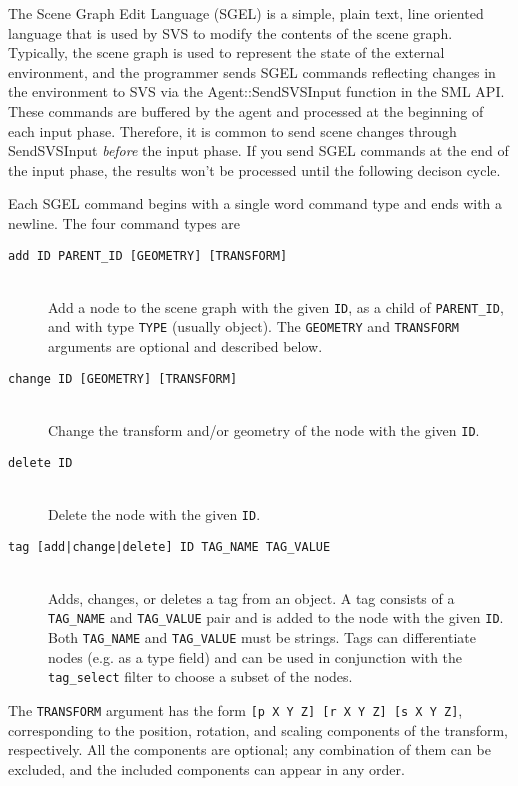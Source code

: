 The Scene Graph Edit Language (SGEL) is a simple, plain text, line oriented language that is used by SVS to modify the contents of the scene graph.
Typically, the scene graph is used to represent the state of the external environment, and the programmer sends SGEL commands reflecting changes in the environment to SVS via the Agent::SendSVSInput function in the SML API.
These commands are buffered by the agent and processed at the beginning of each input phase.
Therefore, it is common to send scene changes through SendSVSInput \emph{before} the input phase.
If you send SGEL commands at the end of the input phase, 
the results won't be processed until the following decison cycle.

Each SGEL command begins with a single word command type and ends with a newline.
The four command types are

\begin{description}
\item[\texttt{add ID PARENT\_ID [GEOMETRY] [TRANSFORM]}] \hfill \\
Add a node to the scene graph with the given \texttt{ID}, as a child of \texttt{PARENT\_ID}, 
and with type \texttt{TYPE} (usually object).
The \texttt{GEOMETRY} and \texttt{TRANSFORM} arguments are optional and described below.

\item[\texttt{change ID [GEOMETRY] [TRANSFORM]}] \hfill \\
Change the transform and/or geometry of the node with the given \texttt{ID}.

\item[\texttt{delete ID}] \hfill \\
  Delete the node with the given \texttt{ID}.

\item[\texttt{tag [add|change|delete] ID TAG\_NAME TAG\_VALUE}] \hfill \\
  Adds, changes, or deletes a tag from an object.
  A tag consists of a \texttt{TAG\_NAME}  
  and \texttt{TAG\_VALUE} pair and is added to the node with the given \texttt{ID}.
  Both \texttt{TAG\_NAME} and \texttt{TAG\_VALUE} must be strings.
  Tags can differentiate nodes (e.g. as a type field) and can be used in conjunction with 
  the \texttt{tag\_select} filter to choose a subset of the nodes. 

\end{description}

The \texttt{TRANSFORM} argument has the form \texttt{[p X Y Z] [r X Y Z] [s X Y Z]}, corresponding to the position, rotation, and scaling components of the transform, respectively.
All the components are optional; any combination of them can be excluded, and the included components can appear in any order.

